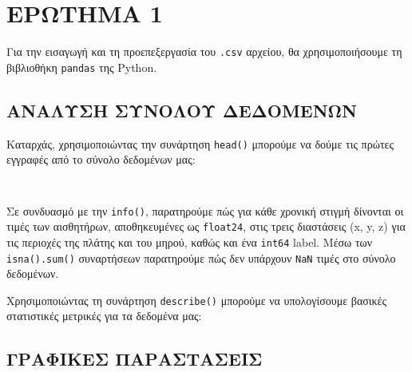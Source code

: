 \chapter{ΕΡΩΤΗΜΑ 1}
    Για την εισαγωγή και τη προεπεξεργασία του \texttt{.csv} αρχείου, θα χρησιμοποιήσουμε τη βιβλιοθήκη \texttt{pandas} της Python.

    \section{ΑΝΑΛΥΣΗ ΣΥΝΟΛΟΥ ΔΕΔΟΜΕΝΩΝ}
        Καταρχάς, χρησιμοποιώντας την συνάρτηση \texttt{head()} μπορούμε να δούμε τις πρώτες εγγραφές από το σύνολο δεδομένων μας:

        \begin{table}[ht] \noindent\centering\tt
        \end{table}

        Σε συνδυασμό με την \texttt{info()}, παρατηρούμε πώς για κάθε χρονική στιγμή δίνονται οι τιμές των αισθητήρων, αποθηκευμένες ως \texttt{float24},
        στις τρεις διαστάσεις (x, y, z) για τις περιοχές της πλάτης και του μηρού, καθώς και ένα \texttt{int64} label. Μέσω των \texttt{isna().sum()} συναρτήσεων παρατηρούμε πώς δεν υπάρχουν \texttt{NaN} τιμές στο σύνολο δεδομένων.

        Χρησιμοποιώντας τη συνάρτηση \texttt{describe()} μπορούμε να υπολογίσουμε βασικές στατιστικές μετρικές για τα δεδομένα μας:



    \section{ΓΡΑΦΙΚΕΣ ΠΑΡΑΣΤΑΣΕΙΣ}